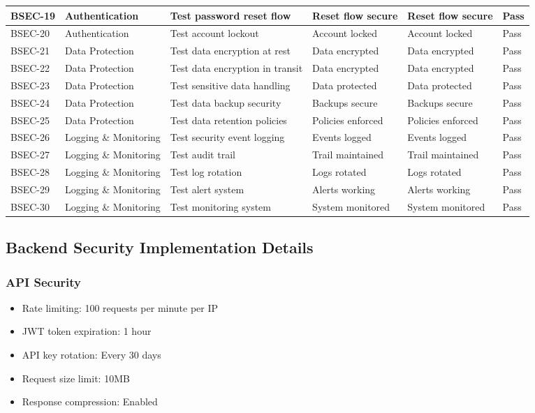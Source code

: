 {\begin{longtable}{|p{1.5cm}|p{2.5cm}|p{3.5cm}|p{2.5cm}|p{2.5cm}|p{1.5cm}|}
\hline
BSEC-19 & Authentication & Test password reset flow & Reset flow secure & Reset flow secure & Pass \\
\hline
BSEC-20 & Authentication & Test account lockout & Account locked & Account locked & Pass \\
\hline
BSEC-21 & Data Protection & Test data encryption at rest & Data encrypted & Data encrypted & Pass \\
\hline
BSEC-22 & Data Protection & Test data encryption in transit & Data encrypted & Data encrypted & Pass \\
\hline
BSEC-23 & Data Protection & Test sensitive data handling & Data protected & Data protected & Pass \\
\hline
BSEC-24 & Data Protection & Test data backup security & Backups secure & Backups secure & Pass \\
\hline
BSEC-25 & Data Protection & Test data retention policies & Policies enforced & Policies enforced & Pass \\
\hline
BSEC-26 & Logging \& Monitoring & Test security event logging & Events logged & Events logged & Pass \\
\hline
BSEC-27 & Logging \& Monitoring & Test audit trail & Trail maintained & Trail maintained & Pass \\
\hline
BSEC-28 & Logging \& Monitoring & Test log rotation & Logs rotated & Logs rotated & Pass \\
\hline
BSEC-29 & Logging \& Monitoring & Test alert system & Alerts working & Alerts working & Pass \\
\hline
BSEC-30 & Logging \& Monitoring & Test monitoring system & System monitored & System monitored & Pass \\
\hline
\end{longtable}
}

\subsection{Backend Security Implementation Details}

\subsubsection{API Security}
\begin{itemize}
    \item Rate limiting: 100 requests per minute per IP
    \item JWT token expiration: 1 hour
    \item API key rotation: Every 30 days
    \item Request size limit: 10MB
    \item Response compression: Enabled
\end{itemize}


